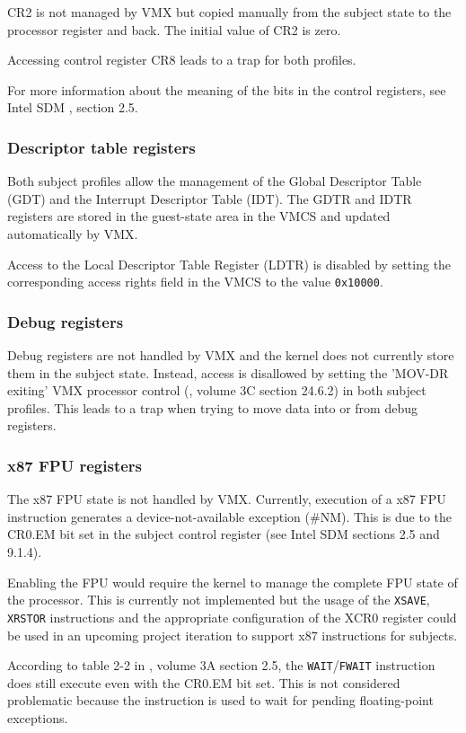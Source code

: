 CR2 is not managed by VMX but copied manually from the subject state to the
processor register and back. The initial value of CR2 is zero.

Accessing control register CR8 leads to a trap for both profiles.

For more information about the meaning of the bits in the control registers, see
Intel SDM \cite{IntelSDM}, section 2.5.

\subsubsection{Descriptor table registers}
Both subject profiles allow the management of the Global Descriptor Table
(GDT) and the Interrupt Descriptor Table (IDT). The GDTR
and IDTR registers are stored in the guest-state area in the VMCS and updated
automatically by VMX.

Access to the Local Descriptor Table Register (LDTR) is disabled by
setting the corresponding access rights field in the VMCS to the value
\texttt{0x10000}.

\subsubsection{Debug registers}
Debug registers are not handled by VMX and the kernel does not currently store
them in the subject state. Instead, access is disallowed by setting the 'MOV-DR
exiting' VMX processor control (\cite{IntelSDM}, volume 3C section 24.6.2) in
both subject profiles. This leads to a trap when trying to move data into or
from debug registers.

\subsubsection{x87 FPU registers}
The x87 FPU state is not handled by VMX. Currently, execution of a x87 FPU
instruction generates a device-not-available exception (\#NM). This is due to
the CR0.EM bit set in the subject control register (see Intel SDM sections 2.5
and 9.1.4).

Enabling the FPU would require the kernel to manage the complete FPU state of
the processor. This is currently not implemented but the usage of the
\texttt{XSAVE}, \texttt{XRSTOR} instructions and the appropriate configuration
of the XCR0 register could be used in an upcoming project iteration to support
x87 instructions for subjects.

According to table 2-2 in \cite{IntelSDM}, volume 3A section 2.5, the
\texttt{WAIT}/\texttt{FWAIT} instruction does still execute even with the CR0.EM
bit set. This is not considered problematic because the instruction is used to
wait for pending floating-point exceptions.

